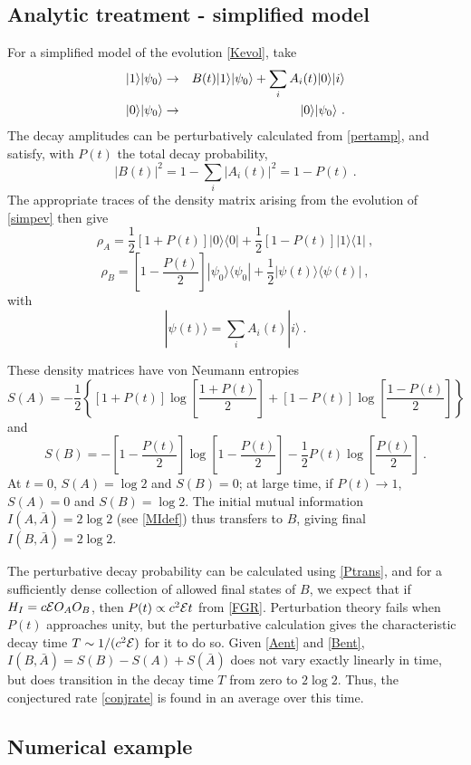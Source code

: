 \documentclass[aps,prd,groupedaddress,nofootinbib,letterpaper]{revtex4}
\newcommand{\cale}{{\cal E}}
\newcommand{\beq}{\begin{equation}}
\newcommand{\eeq}{\end{equation}}
\newcommand{\bea}{\begin{eqnarray}}
\newcommand{\eea}{\end{eqnarray}}
\begin{document}
\subsection{Analytic treatment - simplified model}

For a simplified model of the evolution \eqref{Kevol}, take
\bea\label{simpev}
|1\rangle|\psi_0\rangle & \rightarrow& B(t)  |1\rangle |\psi_0\rangle+ \sum_i A_i(t) |0\rangle|i\rangle\cr
 |0\rangle|\psi_0\rangle&\rightarrow& |0\rangle|\psi_0\rangle \ .
\eea
The decay amplitudes can be perturbatively calculated from \eqref{pertamp}, and satisfy, with $P(t)$ the total decay probability,
\beq
|B(t)|^2 = 1-\sum_i |A_i(t)|^2 = 1-P(t)\ .
\eeq
The appropriate traces of the density matrix arising from the evolution of \eqref{simpev} then give
\beq
\rho_A= \frac{1}{2}\left[1+P(t)\right]|0\rangle\langle0| + \frac{1}{2}\left[1-P(t)\right]|1\rangle\langle1|\ ,
\eeq
\beq
\rho_B=\left[1-\frac{P(t)}{2}\right]|\psi_0\rangle\langle\psi_0| + \frac{1}{2} |\psi(t)\rangle\langle\psi(t)|\ ,
\eeq
with 
\beq
|\psi(t)\rangle= \sum_i A_i(t) |i\rangle\ .
\eeq

These density matrices have von Neumann entropies
\beq\label{Aent}
S(A)=-\frac{1}{2}\left\{\left[1+P(t)\right] \log\left[ \frac{1+P(t)}{2}\right] +\left[1-P(t)\right] \log\left[ \frac{1-P(t)}{2}\right]\right\}
\eeq
and
\beq\label{Bent}
S(B)=-\left[1-\frac{P(t)}{2}\right]\log\left[1-\frac{P(t)}{2}\right] -\frac{1}{2}P(t) \log\left[\frac{P(t)}{2}\right]\ .
\eeq
At $t=0$, $S(A)=\log 2$ and $S(B)=0$; at large time, if $P(t)\rightarrow 1$, $S(A)=0$ and $S(B)=\log2$.  The initial mutual information $I(A,\bar A)=2\log 2$ (see \eqref{MIdef}) thus transfers to $B$, giving final $I(B,\bar A)=2\log 2$.

The perturbative decay probability can be calculated using \eqref{Ptrans}, and for a sufficiently dense collection of allowed final states of $B$, we expect that if $H_I=c\cale O_A O_B$, then $P(t)\propto c^2\cale t$ from \eqref{FGR}.  Perturbation theory fails when $P(t)$ approaches unity, but the perturbative calculation gives the characteristic decay time $T\sim 1/(c^2\cale)$ for it to do so.  Given \eqref{Aent} and \eqref{Bent}, $I(B,\bar A)=S(B)-S(A)+S(\bar A)$ does not vary exactly linearly in time, but does transition in the decay time $T$ from zero to $2\log 2$.  Thus, the conjectured rate \eqref{conjrate} is found in an average over this time.

\subsection{Numerical example}
\end{document}
